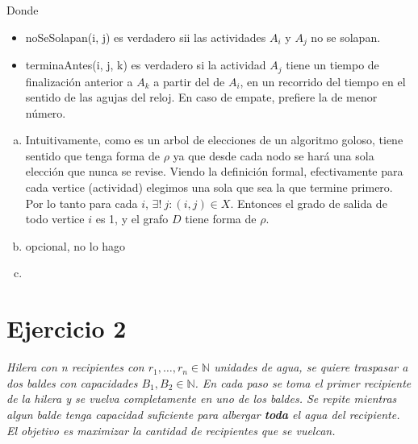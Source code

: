 \documentclass[12pt, a4paper]{report}
\theoremstyle{definition} %
\begin{document}
Donde
\begin{itemize}
    \item noSeSolapan(i, j) es verdadero sii las actividades $A_i$ y $A_j$ no se solapan.
    \item terminaAntes(i, j, k) es verdadero si la actividad $A_j$ tiene un tiempo de finalización anterior a $A_k$ a partir del de $A_i$, en un recorrido del tiempo en el sentido de las agujas del reloj. En caso de empate, prefiere la de menor número.
\end{itemize}

\begin{enumerate}[a), resume]
\item Intuitivamente, como es un arbol de elecciones de un algoritmo goloso, tiene sentido que tenga forma de $\rho$ ya que desde cada nodo se hará una sola elección que nunca se revise. Viendo la definición formal, efectivamente para cada vertice (actividad) elegimos una sola que sea la que termine primero. Por lo tanto para cada $i$,  $\exists!\ j : (i, j) \in X$. Entonces el grado de salida de todo vertice $i$ es 1, y el grafo $D$ tiene forma de $\rho$.

\item opcional, no lo hago

\item 
\end{enumerate}

\section*{Ejercicio 2}

\textit{Hilera con n recipientes con $r_1, \ldots, r_n \in \mathbb{N}$ unidades de agua, se quiere traspasar a dos baldes con capacidades $B_1, B_2 \in \mathbb{N}$. En cada paso se toma el primer recipiente de la hilera y se vuelva completamente en uno de los baldes. Se repite mientras algun balde tenga capacidad suficiente para albergar \textbf{toda} el agua del recipiente. El objetivo es maximizar la cantidad de recipientes que se vuelcan.}
\end{document}
